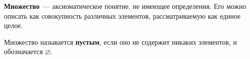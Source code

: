 \textbf{Множество}~--- аксиоматическое понятие, не имеющее определения.
Его можно описать как совокупность различных элементов, рассматриваемую как единое целое.

Множество называется \textbf{пустым}, если оно не содержит никаких элементов, и обозначается $\varnothing$.